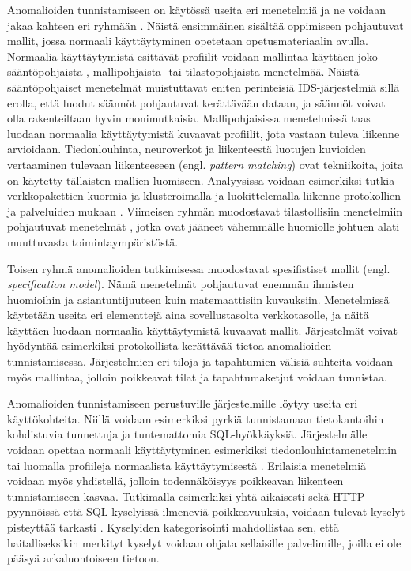 Anomalioiden tunnistamiseen on käytössä useita eri menetelmiä ja ne voidaan jakaa kahteen eri ryhmään \cite{State}. Näistä ensimmäinen sisältää oppimiseen pohjautuvat mallit, jossa normaali 
käyttäytyminen opetetaan opetusmateriaalin avulla. Normaalia käyttäytymistä esittävät profiilit voidaan mallintaa käyttäen joko sään\-tö\-poh\-jais\-ta-, mallipohjaista- tai tilastopohjaista menetelmää. Näistä
sääntöpohjaiset menetelmät muistuttavat eniten perinteisiä IDS-järjestelmiä sillä erolla, että luodut säännöt pohjautuvat kerättävään dataan, ja säännöt voivat olla rakenteiltaan hyvin monimutkaisia. 
Mallipohjaisissa menetelmissä taas luodaan normaalia käyttäytymistä kuvaavat profiilit, jota vastaan tuleva liikenne arvioidaan. Tiedonlouhinta, neuroverkot ja liikenteestä luotujen kuvioiden vertaaminen
tulevaan liikenteeseen (engl. \textit{pattern matching}) ovat tekniikoita, joita on käytetty tällaisten mallien luomiseen. Analyysissa voidaan esimerkiksi tutkia verkkopakettien kuormia \cite{Payload}\cite{ULISSE} 
ja klusteroimalla ja luokittelemalla liikenne protokollien ja palveluiden mukaan \cite{Cluster}. Viimeisen ryhmän muodostavat tilastollisiin menetelmiin pohjautuvat menetelmät \cite{PacketHeader}, jotka
ovat jääneet vähemmälle huomiolle johtuen alati muuttuvasta toimintaympäristöstä.

Toisen ryhmä anomalioiden tutkimisessa muodostavat spesifistiset mallit (engl. \textit{specification model}). Nämä menetelmät pohjautuvat enemmän ihmisten huomioihin ja asiantuntijuuteen kuin matemaattisiin
kuvauksiin. Menetelmissä käytetään useita eri elementtejä aina sovellustasolta verkkotasolle, ja näitä käyttäen luodaan normaalia käyttäytymistä kuvaavat mallit. Järjestelmät voivat hyödyntää esimerkiksi
protokollista kerättävää tietoa anomalioiden tunnistamisessa. Järjestelmien eri tiloja ja tapahtumien välisiä suhteita voidaan myös mallintaa, jolloin poikkeavat tilat ja tapahtumaketjut voidaan
tunnistaa. 

Anomalioiden tunnistamiseen perustuville järjestelmille löytyy useita eri käyttökohteita. Niillä voidaan esimerkiksi pyrkiä tunnistamaan tietokantoihin kohdistuvia tunnettuja ja tuntemattomia SQL-hyökkäyksiä.
Järjestelmälle voidaan opettaa normaali käyttäytyminen esimerkiksi tiedonlouhintamenetelmin \cite{Data} tai luomalla profiileja normaalista käyttäytymisestä \cite{SQLanomaly}\cite{SQLlearning}. Erilaisia
menetelmiä voidaan myös yhdistellä, jolloin todennäköisyys poikkeavan liikenteen tunnistamiseen kasvaa. Tutkimalla esimerkiksi yhtä aikaisesti sekä HTTP-pyynnöissä että SQL-kyselyissä ilmeneviä poikkeavuuksia, 
voidaan tulevat kyselyt pisteyttää tarkasti \cite{WebSQL}. Kyselyiden kategorisointi mahdollistaa sen, että haitalliseksikin merkityt kyselyt voidaan ohjata sellaisille palvelimille, joilla ei ole 
pääsyä arkaluontoiseen tietoon. 

